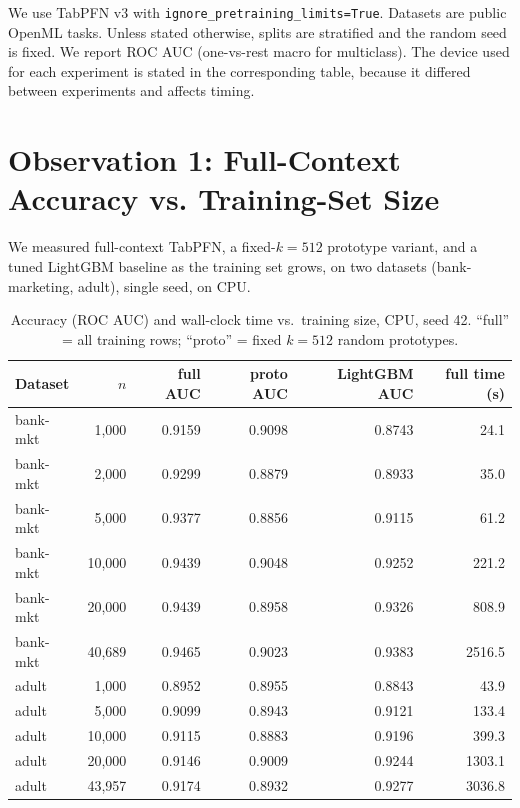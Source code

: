 \documentclass[11pt,a4paper]{article}
\begin{document}
We use TabPFN v3 with \texttt{ignore\_pretraining\_limits=True}. Datasets are
public OpenML tasks. Unless stated otherwise, splits are stratified and the
random seed is fixed. We report ROC AUC (one-vs-rest macro for multiclass).
The device used for each experiment is stated in the corresponding table,
because it differed between experiments and affects timing.

\section{Observation 1: Full-Context Accuracy vs. Training-Set Size}

We measured full-context TabPFN, a fixed-$k{=}512$ prototype variant, and a
tuned LightGBM baseline as the training set grows, on two datasets
(bank-marketing, adult), single seed, on CPU.

\begin{table}[h]
\centering
\caption{Accuracy (ROC AUC) and wall-clock time vs.\ training size, CPU,
seed 42. ``full'' = all training rows; ``proto'' = fixed $k{=}512$ random
prototypes.}
\label{tab:scaling}
\begin{tabular}{lrrrrr}
\toprule
Dataset & $n$ & full AUC & proto AUC & LightGBM AUC & full time (s) \\
\midrule
bank-mkt & 1{,}000  & 0.9159 & 0.9098 & 0.8743 & 24.1 \\
bank-mkt & 2{,}000  & 0.9299 & 0.8879 & 0.8933 & 35.0 \\
bank-mkt & 5{,}000  & 0.9377 & 0.8856 & 0.9115 & 61.2 \\
bank-mkt & 10{,}000 & 0.9439 & 0.9048 & 0.9252 & 221.2 \\
bank-mkt & 20{,}000 & 0.9439 & 0.8958 & 0.9326 & 808.9 \\
bank-mkt & 40{,}689 & 0.9465 & 0.9023 & 0.9383 & 2516.5 \\
\midrule
adult & 1{,}000  & 0.8952 & 0.8955 & 0.8843 & 43.9 \\
adult & 5{,}000  & 0.9099 & 0.8943 & 0.9121 & 133.4 \\
adult & 10{,}000 & 0.9115 & 0.8883 & 0.9196 & 399.3 \\
adult & 20{,}000 & 0.9146 & 0.9009 & 0.9244 & 1303.1 \\
adult & 43{,}957 & 0.9174 & 0.8932 & 0.9277 & 3036.8 \\
\bottomrule
\end{tabular}
\end{table}
\end{document}
